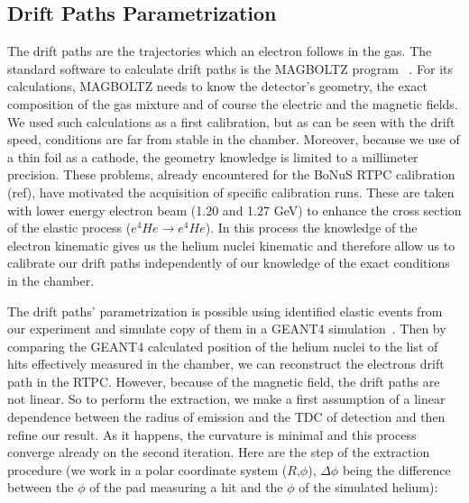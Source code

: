 \documentclass[twocolumn,showpacs,superscriptaddress,groupedaddress]{revtex4}
\begin{document}
   
\subsection{Drift Paths Parametrization}

The drift paths are the trajectories which an electron follows in the gas. The 
standard software to calculate drift paths is the MAGBOLTZ program 
~\cite{MAGBOLTZ}. For its calculations, MAGBOLTZ needs to know the detector's 
geometry, the exact composition of the gas mixture and of course the electric 
and the magnetic fields. We used such calculations as a first calibration, but 
as can be seen with the drift speed, conditions are far from stable in the 
chamber. Moreover, because we use of a thin foil as a cathode, the geometry 
knowledge is limited to a millimeter precision. These problems, already 
encountered for the BoNuS RTPC calibration (ref), have motivated the 
acquisition of specific calibration runs. These are taken with lower energy 
electron beam (1.20 and 1.27 GeV) to enhance the cross section of the elastic 
process ($e ^{4}He \rightarrow e ^{4}He$). In this process the knowledge of the 
electron kinematic gives us the helium nuclei kinematic and therefore allow us 
to calibrate our drift paths independently of our knowledge of the exact 
conditions in the chamber.

The drift paths' parametrization is possible using identified elastic events 
from our experiment and simulate copy of them in a GEANT4 
simulation~\cite{GEANT4}. Then by comparing the GEANT4 calculated position of 
the helium nuclei to the list of hits effectively measured in the chamber, we 
can reconstruct the electrons drift path in the RTPC. However, because of the 
magnetic field, the drift paths are not linear. So to perform the extraction, 
we make a first assumption of a linear dependence between the radius of 
emission and the TDC of detection and then refine our result. As it happens, 
the curvature is minimal and this process converge already on the second 
iteration. Here are the step of the extraction procedure (we work in a polar 
coordinate system ($R$,$\phi$), $\Delta\phi$ being the difference between the 
$\phi$ of the pad measuring a hit and the $\phi$ of the simulated helium):
\end{document}
